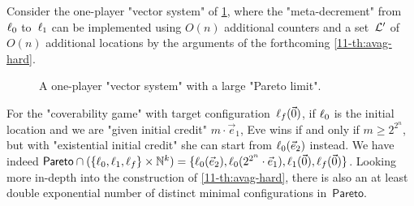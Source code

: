 \begin{example}
\label{11-ex:pareto}
  Consider the one-player "vector system" of \cref{11-fig:pareto},
  where the "meta-decrement" from~$\ell_0$ to~$\ell_1$ can be
  implemented using $O(n)$ additional counters and a set~$\mathcal L'$ of
  $O(n)$ additional locations by the arguments of the
  forthcoming \cref{11-th:avag-hard}.
  
  \begin{figure}[htbp]
    \centering
  \caption{A one-player "vector system"
  with a large "Pareto limit".}\label{11-fig:pareto}
  \end{figure}
  For the "coverability game" with target
  configuration~$\ell_f(\vec 0)$, if $\ell_0$ is the initial location
  and we are "given initial credit" $m\cdot\vec e_1$, Eve wins if and
  only if $m\geq 2^{2^n}$, but with "existential initial credit" she
  can start from $\ell_0(\vec e_2)$ instead.  We have indeed
  $\mathsf{Pareto}\cap(\{\ell_0,\ell_1,\ell_f\}\times\mathbb N^k)=\{\ell_0(\vec
  e_2),\ell_0(2^{2^n}\cdot\vec e_1),\ell_1(\vec 0),\ell_f(\vec 0)\}$.
  Looking more in-depth into the construction of \cref{11-th:avag-hard},
  there is also an at least double exponential number of distinct
  minimal configurations in~$\mathsf{Pareto}$.
\end{example}



